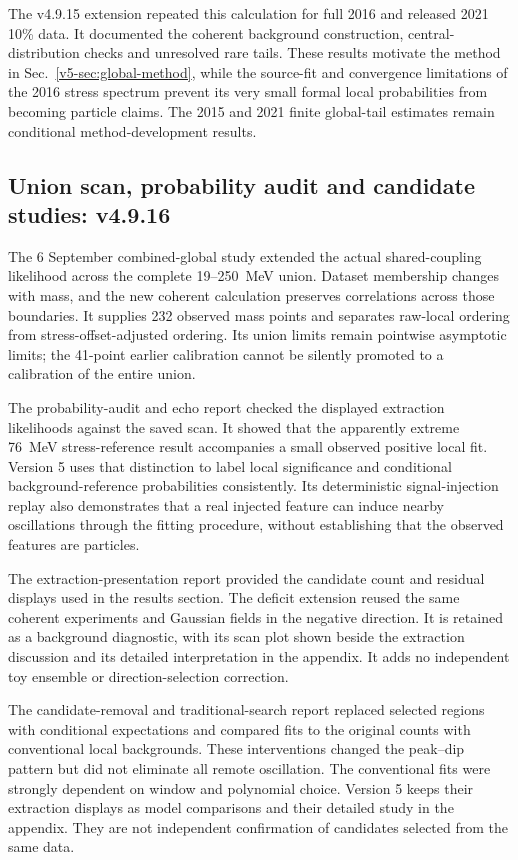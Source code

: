 The v4.9.15 extension repeated this calculation for full 2016 and
released 2021 10\% data. It documented the coherent background
construction, central-distribution checks and unresolved rare tails.
These results motivate the method in Sec.~\ref{v5-sec:global-method},
while the source-fit and convergence limitations of the 2016 stress spectrum prevent
its very small formal local probabilities from becoming particle claims.
The 2015 and 2021 finite global-tail estimates remain conditional
method-development results.

\subsection{Union scan, probability audit and candidate studies: v4.9.16}
The 6 September combined-global study extended the actual shared-coupling
likelihood across the complete 19--250~MeV union. Dataset membership changes
with mass, and the new coherent calculation preserves correlations across
those boundaries. It supplies 232 observed mass points and separates
raw-local ordering from stress-offset-adjusted ordering. Its union limits
remain pointwise asymptotic limits; the 41-point earlier calibration
cannot be silently promoted to a calibration of the entire union.

The probability-audit and echo report checked the displayed extraction
likelihoods against the saved scan. It showed that the apparently extreme
76~MeV stress-reference result accompanies a small observed positive
local fit. Version 5 uses that distinction to label local significance
and conditional background-reference probabilities consistently. Its
deterministic signal-injection replay also demonstrates that a real
injected feature can induce nearby oscillations through the fitting
procedure, without establishing that the observed features are particles.

The extraction-presentation report provided the candidate count and
residual displays used in the results section. The deficit extension
reused the same coherent experiments and Gaussian fields in the negative
direction. It is retained as a background diagnostic, with its scan plot
shown beside the extraction discussion and its detailed interpretation
in the appendix. It adds no independent toy ensemble or direction-selection
correction.

The candidate-removal and traditional-search report replaced selected
regions with conditional expectations and compared fits to the original
counts with conventional local backgrounds. These interventions changed
the peak--dip pattern but did not eliminate all remote oscillation.
The conventional fits were strongly dependent on window and polynomial
choice. Version 5 keeps their extraction displays as model comparisons
and their detailed study in the appendix. They are not independent
confirmation of candidates selected from the same data.

